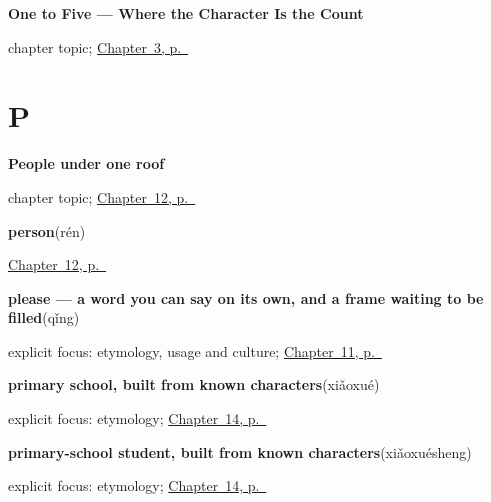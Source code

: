 \noindent\begin{minipage}[t]{\linewidth}
\raggedright
\textbf{One to Five — Where the Character Is the Count}\par
\footnotesize chapter topic; \hyperref[ch:zh-numbers]{Chapter~3, p.~\pageref*{ch:zh-numbers}}
\end{minipage}\par\smallskip

\section*{P}

\noindent\begin{minipage}[t]{\linewidth}
\raggedright
\textbf{People under one roof}\par
\footnotesize chapter topic; \hyperref[ch:zh-family-six]{Chapter~12, p.~\pageref*{ch:zh-family-six}}
\end{minipage}\par\smallskip

\noindent\begin{minipage}[t]{\linewidth}
\raggedright
\textbf{person}\enspace\emph{}\enspace(rén)\par
\footnotesize \hyperref[ch:zh-family-six]{Chapter~12, p.~\pageref*{ch:zh-family-six}}
\end{minipage}\par\smallskip

\noindent\begin{minipage}[t]{\linewidth}
\raggedright
\textbf{please — a word you can say on its own, and a frame waiting to be filled}\enspace\emph{}\enspace(qǐng)\par
\footnotesize explicit focus: etymology, usage and culture; \hyperref[ch:zh-qing]{Chapter~11, p.~\pageref*{ch:zh-qing}}
\end{minipage}\par\smallskip

\noindent\begin{minipage}[t]{\linewidth}
\raggedright
\textbf{primary school, built from known characters}\enspace\emph{}\enspace(xiǎoxué)\par
\footnotesize explicit focus: etymology; \hyperref[ch:zh-primary-three]{Chapter~14, p.~\pageref*{ch:zh-primary-three}}
\end{minipage}\par\smallskip

\noindent\begin{minipage}[t]{\linewidth}
\raggedright
\textbf{primary-school student, built from known characters}\enspace\emph{}\enspace(xiǎoxuésheng)\par
\footnotesize explicit focus: etymology; \hyperref[ch:zh-primary-three]{Chapter~14, p.~\pageref*{ch:zh-primary-three}}
\end{minipage}\par\smallskip

